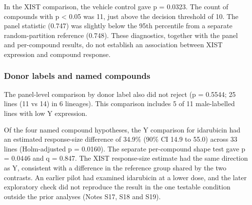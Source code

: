 \documentclass[
  11pt,
  letterpaper,
]{article}
\begin{document}
In the XIST comparison, the vehicle control gave p = 0.0323. The count
of compounds with p \textless{} 0.05 was 11, just above the decision
threshold of 10. The panel statistic (0.747) was slightly below the 95th
percentile from a separate random-partition reference (0.748). These
diagnostics, together with the panel and per-compound results, do not
establish an association between XIST expression and compound response.

\subsubsection{Donor labels and named
compounds}\label{donor-labels-and-named-compounds}

The panel-level comparison by donor label also did not reject (p =
0.5544; 25 lines (11 vs 14) in 6 lineages). This comparison includes 5
of 11 male-labelled lines with low Y expression.

Of the four named compound hypotheses, the Y comparison for idarubicin
had an estimated response-size difference of 34.9\% (90\% CI 14.9 to
55.0) across 33 lines (Holm-adjusted p = 0.0160). The separate
per-compound shape test gave p = 0.0446 and q = 0.847. The XIST
response-size estimate had the same direction as Y, consistent with a
difference in the reference group shared by the two contrasts. An
earlier pilot had examined idarubicin at a lower dose, and the later
exploratory check did not reproduce the result in the one testable
condition outside the prior analyses (Notes S17, S18 and S19).
\end{document}
